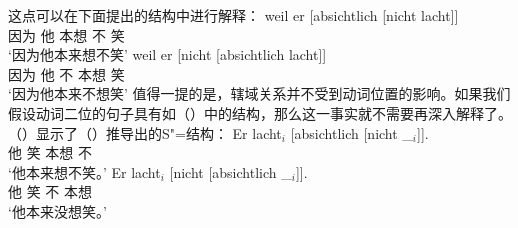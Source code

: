 \begin{enumerate}
{%
}
这点可以在下面提出的结构中进行解释：
\eal
\label{bsp-absichtlich-nicht-anal}
\ex 
\gll weil er [absichtlich [nicht lacht]]\\
	 因为 他 \spacebr{}本想 \spacebr{}不 笑\\
\glt `因为他本来想不笑'
\ex 
\gll weil er [nicht [absichtlich lacht]]\\
     因为 他 \spacebr{}不 \spacebr{}本想 笑\\
\glt `因为他本来不想笑'
\zl
值得一提的是，辖域关系并不受到动词位置的影响。如果我们假设动词二位的句子具有如（）中的结构，那么这一事实就不需要再深入解释了。（）显示了（）推导出的S"=结构：
\eal
\label{bsp-absichtlich-nicht-anal-v1}
\ex 
\gll Er lacht$_i$ [absichtlich [nicht \_$_i$]].\\
     他 笑 \spacebr{}本想 \spacebr{}不\\
\glt `他本来想不笑。'
\ex 
\gll Er lacht$_i$  [nicht [absichtlich \_$_i$]].\\
     他 笑 \spacebr{}不 \spacebr{}本想\\
\glt `他本来没想笑。'
\zl{}
\nocite{Hoehle88a,Hoehle97a}
\end{enumerate}

